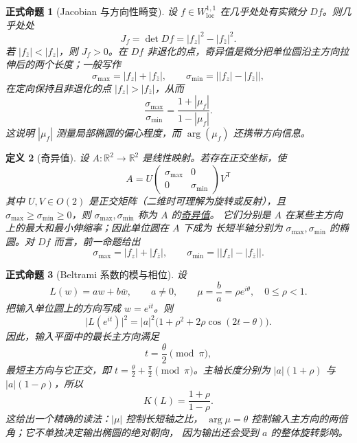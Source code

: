 \documentclass[UTF8,fontset=none,a4paper,11pt]{ctexart}
\theoremstyle{foundation-definition}
\newtheorem{definition}{定义}[section]
\theoremstyle{foundation-theorem}
\theoremstyle{foundation-proposition}
\newtheorem{proposition}[definition]{正式命题}
\theoremstyle{foundation-example}
\theoremstyle{foundation-remark}
\theoremstyle{foundation-theorem}
\newcommand{\term}[2]{\hyperref[#1]{#2}}
\begin{document}
\begin{proposition}[Jacobian 与方向性畸变]\label{prop:jacobian-distortion}
设 \(f\in W^{1,1}_{\mathrm{loc}}\) 在几乎处处有实微分 \(Df\)。则几乎处处
\[
J_f=\det Df=|f_z|^2-|f_{\bar z}|^2.
\]
若 \(|f_{\bar z}|<|f_z|\)，则 \(J_f>0\)。在 \(Df\) 非退化的点，奇异值是微分把单位圆沿主方向拉伸后的两个长度；一般写作
\[
\sigma_{\max}=|f_z|+|f_{\bar z}|,
\qquad
\sigma_{\min}=\bigl||f_z|-|f_{\bar z}|\bigr|,
\]
在定向保持且非退化的点 \(|f_z|>|f_{\bar z}|\)，从而
\[
\frac{\sigma_{\max}}{\sigma_{\min}}
=\frac{1+|\mu_f|}{1-|\mu_f|}.
\]
这说明 \(|\mu_f|\) 测量局部椭圆的偏心程度，而 \(\arg(\mu_f)\) 还携带方向信息。
\end{proposition}

\begin{definition}[奇异值]\label{def:singular-values}
设 \(A:\mathbb R^2\to\mathbb R^2\) 是线性映射。若存在正交坐标，使
\[
A=U\begin{pmatrix}\sigma_{\max}&0\\0&\sigma_{\min}\end{pmatrix}V^{\mathsf T}
\]
其中 \(U,V\in O(2)\) 是正交矩阵（二维时可理解为旋转或反射），且
\(\sigma_{\max}\geq\sigma_{\min}\geq0\)，则
\(\sigma_{\max},\sigma_{\min}\) 称为 \(A\) 的\term{def:singular-values}{奇异值}。
它们分别是 \(A\) 在某些主方向上的最大和最小伸缩率；因此单位圆在 \(A\) 下成为
长短半轴分别为 \(\sigma_{\max},\sigma_{\min}\) 的椭圆。对 \(Df\) 而言，前一命题给出
\[
\sigma_{\max}=|f_z|+|f_{\bar z}|,\qquad
\sigma_{\min}=\bigl||f_z|-|f_{\bar z}|\bigr|.
\]
\end{definition}

\begin{proposition}[Beltrami 系数的模与相位]\label{prop:beltrami-phase-direction}
设
\[
L(w)=aw+b\overline w,\qquad a\neq0,
\qquad \mu=\frac ba=\rho e^{i\theta},
\quad 0\leq\rho<1.
\]
把输入单位圆上的方向写成 \(w=e^{it}\)。则
\[
\lvert L(e^{it})\rvert^2
 =\lvert a\rvert^2\bigl(1+\rho^2+2\rho\cos(2t-\theta)\bigr).
\]
因此，输入平面中的最长主方向满足
\[
t=\frac{\theta}{2}\pmod{\pi},
\]
最短主方向与它正交，即
\(t=\frac{\theta}{2}+\frac\pi2\pmod{\pi}\)。主轴长度分别为
\(\lvert a\rvert(1+\rho)\) 与 \(\lvert a\rvert(1-\rho)\)，所以
\[
K(L)=\frac{1+\rho}{1-\rho}.
\]
这给出一个精确的读法：\(\lvert\mu\rvert\) 控制长短轴之比，
\(\arg\mu=\theta\) 控制输入主方向的两倍角；它不单独决定输出椭圆的绝对朝向，
因为输出还会受到 \(a\) 的整体旋转影响。
\end{proposition}
\end{document}
